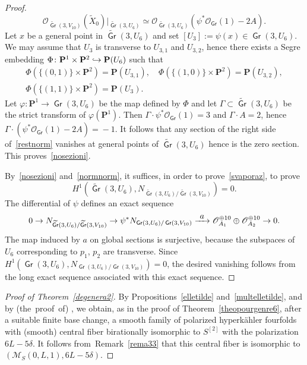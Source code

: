 \documentclass[JEP,XML,SOM,Unicode, NoEqCountersInSection,NoFloatCountersInSection]{cedram}
\let\mathcal\mathscr
\newcommand\hto{\mathrel{\lhook\joinrel\to}}
\newcommand\To[1]{\mathchoice{\xrightarrow{\textstyle\kern4pt#1\kern3pt}}{\stackrel{#1}{\longrightarrow}}{}{}}
\theoremstyle{definition}
\renewcommand\P{{\mathbf P}}\let\PP\P
\newcommand\cM{\mathcal{M}}
\newcommand\cO{\mathcal{O}}\let\OO\cO
\DeclareMathOperator{\Gr}{\mathsf{Gr}}
\let\isom\simeq
\let\phi\varphi
\let\wt\widetilde
\let\Ld L
\newcommand\hilbS{S^{[2]}}
\newcommand\hk{hyperkähler\xspace}
\begin{document}
\begin{proof}
\begin{equation}\label{restnorm}
\cO_{\wt{\Gr}(3,V_{10})}(\wt{X}_0)\vert_{\wt{\Gr}(3,U_6)}\isom \cO_{\wt{\Gr}(3,U_6)}(\psi^{*}\cO_{\Gr}(1)-2A).
\end{equation}
Let $x$ be a general point in $ \wt{\Gr}(3,U_6)$
and set $[U_3]:=\psi(x)\in \Gr(3,U_6)$. We may assume that $U_3$ is transverse to $U_{3,1} $ and $U_{3,2} $, hence there exists a Segre embedding $\Phi\colon\PP^1\times\PP^2\hto\PP(U_6)$ such that\vspace*{-3pt}
\begin{gather*}
\Phi(\{(0,1)\}\times \P^2)=\P(U_{3,1}),\quad
\Phi(\{(1,0)\}\times \P^2)=\P(U_{3,2} ),\\
\Phi(\{(1,1)\}\times \P^2)= \PP(U_3).
\end{gather*}
Let $\phi\colon\PP^1\to\Gr(3,U_6)$ be the map defined by $\Phi$ and let $\Gamma\subset\wt{\Gr}(3,U_6)$ be the strict transform of $\phi(\PP^1)$. Then $\Gamma\cdot\psi^{*}\cO_{\Gr}(1)\!=\!3$ and
$\Gamma\cdot A\!=\!2$, hence \hbox{$\Gamma\cdot(\psi^{*}\cO_{\Gr}(1)\!-\!2A)\!=\!-1$}. It follows that any section of the right side of~\eqref{restnorm} vanishes at general points of $\wt{\Gr}(3,U_6)$ hence is the zero section.
This proves~\eqref{nosezioni}.

By~\eqref{nosezioni} and~\eqref{normnorm}, it suffices, in order to prove~\eqref{svaporaz}, to prove\vspace*{-3pt}
\[
H^1(\wt{\Gr}(3,U_6), N_{\wt{\Gr}(3,U_6)/\wt{\Gr}(3,V_{10})})= 0.
\]
The differential of $\psi$ defines an exact sequence\vspace*{-3pt}
\[
0\to N_{\wt{\Gr}(3,U_6)/\wt{\Gr}(3,V_{10})} \to \psi^{*}N_{\Gr(3,U_6)/\Gr(3,V_{10})} \To{a} \cO^{\oplus 10}_{A_1}\oplus\cO^{\oplus 10}_{A_2} \to 0.
\]
The map induced by $a$ on global sections is surjective, because the subspaces of $U_6$ corresponding to $p_1$, $p_2$ are transverse. Since $H^1(\Gr(3,U_6),N_{\Gr(3,U_6)/\Gr(3,V_{10})})=0$, the desired vanishing follows from the long exact sequence associated with this exact sequence.
\end{proof}

\begin{proof}[Proof of Theorem~\ref{degenera2}]
By Propositions~\ref{elletilde} and~\ref{multelletilde}, and by (the~proof~of) \cite[Th.\,(0.1)]{KLSV}, we obtain, as in the proof of Theorem~\ref{theopourgenre6},
after a suitable finite base change, a smooth family of polarized \hk fourfolds with (smooth) central fiber birationally isomorphic to $\hilbS$ with the polarization $6L-5\delta$. It follows from~Remark~\ref{rema33} that this central fiber is isomorphic to $(\cM_S(0,L,1),6\Ld-5\delta)$.
\end{proof}
\end{document}
